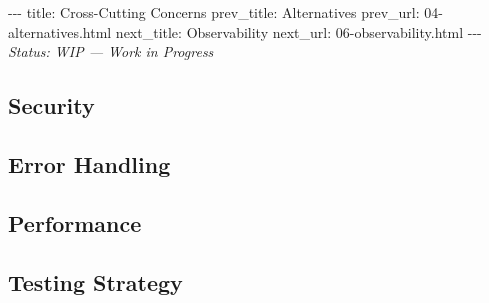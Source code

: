 \documentclass[12pt,a4paper]{article}
\begin{document}
-\/-\/- title: Cross-Cutting Concerns prev\_title: Alternatives
prev\_url: 04-alternatives.html next\_title: Observability next\_url:
06-observability.html -\/-\/- \emph{Status: WIP --- Work in Progress}

\subsection{Security}\label{security}

\subsection{Error Handling}\label{error-handling}

\subsection{Performance}\label{performance}

\subsection{Testing Strategy}\label{testing-strategy}
\end{document}
